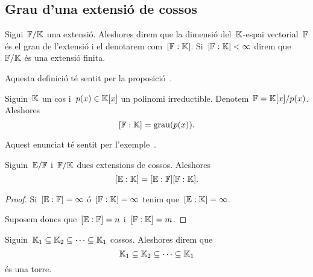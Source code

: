 \documentclass[../../main.tex]{subfiles}
\begin{document}
\subsection{Grau d'una extensió de cossos}
    \begin{definition}
        \label{def:grau d'una extensió}
        \label{def:extensió finita}
        Sigui~\(\mathbb{F}/\mathbb{K}\) una extensió.
        Aleshores direm que la dimensió del~\(\mathbb{K}\)-espai vectorial~\(\mathbb{F}\) és el {grau de l'extensió} i el denotarem com~\([\mathbb{F}:\mathbb{K}]\).
        Si~\([\mathbb{F}:\mathbb{K}]<\infty\) direm que~\(\mathbb{F}/\mathbb{K}\) és una extensió finita.

        Aquesta definició té sentit per la proposició~.
    \end{definition}
    \begin{example}
        \label{ex:el grau de l'extensió d'un cos i el quocient entre el seu anell de polinomis i un polinomi irreductible}
        Siguin~\(\mathbb{K}\) un cos i~\(p(x)\in\mathbb{K}[x]\) un polinomi irreductible.
        Denotem~\(\mathbb{F}=\mathbb{K}[x]/p(x)\).
        Aleshores
        \[
            [\mathbb{F}:\mathbb{K}]=\operatorname{grau}(p(x)).
        \]
        \begin{solution}
            Aquest enunciat té sentit per l'exemple~.
        \end{solution}
    \end{example}
    \begin{theorem}
        \label{thm:fórmula de les torres}
        Siguin~\(\mathbb{E}/\mathbb{F}\) i~\(\mathbb{F}/\mathbb{K}\) dues extensions de cossos.
        Aleshores
        \[
            [\mathbb{E}:\mathbb{K}]=[\mathbb{E}:\mathbb{F}][\mathbb{F}:\mathbb{K}].
        \]
        \begin{proof}
            Si~\([\mathbb{E}:\mathbb{F}]=\infty\) ó~\([\mathbb{F}:\mathbb{K}]=\infty\) tenim que~\([\mathbb{E}:\mathbb{K}]=\infty\).

            Suposem doncs que~\([\mathbb{E}:\mathbb{F}]=n\) i~\([\mathbb{F}:\mathbb{K}]=m\).
        \end{proof}
    \end{theorem}
    \begin{definition}[Torre]
        \label{def:torre de cossos}
        Siguin~\(\mathbb{K}_{1}\subseteq\mathbb{K}_{2}\subseteq\dots\subseteq\mathbb{K}_{1}\) cossos.
        Aleshores direm que
        \[
            \mathbb{K}_{1}\subseteq\mathbb{K}_{2}\subseteq\dots\subseteq\mathbb{K}_{1}
        \]
        és una torre.
    \end{definition}
\end{document}
